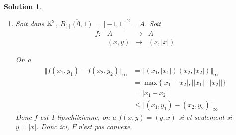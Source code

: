 \documentclass[12pt]{article}
\newtheorem{solution}{Solution}[section]
\theoremstyle{remark}
\newcommand{\function}[5]{
	$$
	\begin{array}{rccl}
		#1: & #2 & \to & #3 \\
		& #4 & \mapsto & #5
	\end{array}
	$$
}
\numberwithin{equation}{section}
\begin{document}
\begin{solution}
\begin{enumerate}
		Comme la norme est euclidienne, il existe $\lambda\in\R_{+}$ tel que $f(x)-f(z)=\lambda(f(z)-f(y))$ d'où $f(x)+\lambda f(y)=(\lambda+1)f(z)$ d'où $f(z)=\frac{x+\lambda y}{\lambda+1}=t'x+(1-t')y$ avec $t'=\frac{1}{\lambda+1}\in[0,1]$. En reportant, on a 
		$$\Vert f(x)-f(z))\Vert=\Vert x-t'x-(1-t')y\Vert=(1-t')\Vert x-y\Vert=\Vert x-z\Vert=(1-t)\Vert x-y\Vert$$
		Si $x\neq y$, alors $t=t'$ et $f(z)=tx+(1-t)y=z$.

		\item Soit dans $\mathbb{R}^{2}$, $\overline{B_{\Vert\cdot\Vert}(0,1)}=[-1,1]^{2}=A$. Soit \function{f}{A}{A}{(x,y)}{(x,\vert x\vert)}
		On a 
		\begin{align*}
			\Vert f(x_{1},y_{1})-f(x_{2},y_{2})\Vert_{\infty}
			&= \Vert (x_{1},\vert x_{1}\vert)(x_{2},\vert x_{2}\vert)\Vert_{\infty}\\
			&=\max\{\vert x_{1}-x_{2}\vert, \bigl\vert\vert x_{1}\vert-\vert x_{2}\vert\bigr\vert\}\\
			&=\vert x_{1}-x_{2}\vert\\
			&\leqslant\Vert (x_{1},y_{1})-(x_{2},y_{2})\Vert_{\infty}
		\end{align*}
		Donc $f$ est 1-lipschitzienne, on a $f(x,y)=(y,x)$ si et seulement si $y=\vert x\vert$. Donc ici, $F$ n'est pas convexe.
	\end{enumerate}
\end{solution}
\end{document}
